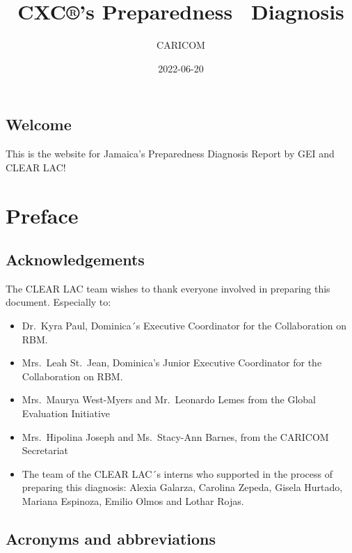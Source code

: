 \documentclass[
  10pt,
]{book}
\title{CXC®'s Preparedness ~Diagnosis}
\author{CARICOM}
\date{2022-06-20}
\begin{document}
\maketitle

{
\setcounter{tocdepth}{1}
\tableofcontents
}
\hypertarget{welcome}{%
\chapter*{Welcome}\label{welcome}}

This is the website for Jamaica's Preparedness Diagnosis Report by GEI and CLEAR LAC!

\hypertarget{part-preface}{%
\part{Preface}\label{part-preface}}

\hypertarget{acknowledgements}{%
\chapter*{Acknowledgements}\label{acknowledgements}}

The CLEAR LAC team wishes to thank everyone involved in preparing this document. Especially to:

\begin{itemize}
\item
  Dr.~Kyra Paul, Dominica´s Executive Coordinator for the Collaboration on RBM.
\item
  Mrs.~Leah St.~Jean, Dominica's Junior Executive Coordinator for the Collaboration on RBM.
\item
  Mrs.~Maurya West-Myers and Mr.~Leonardo Lemes from the Global Evaluation Initiative
\item
  Mrs.~Hipolina Joseph and Ms.~Stacy-Ann Barnes, from the CARICOM Secretariat
\item
  The team of the CLEAR LAC´s interns who supported in the process of preparing this diagnosis: Alexia Galarza, Carolina Zepeda, Gisela Hurtado, Mariana Espinoza, Emilio Olmos and Lothar Rojas.
\end{itemize}

\hypertarget{acronyms-and-abbreviations}{%
\chapter*{Acronyms and abbreviations}\label{acronyms-and-abbreviations}}
\end{document}
